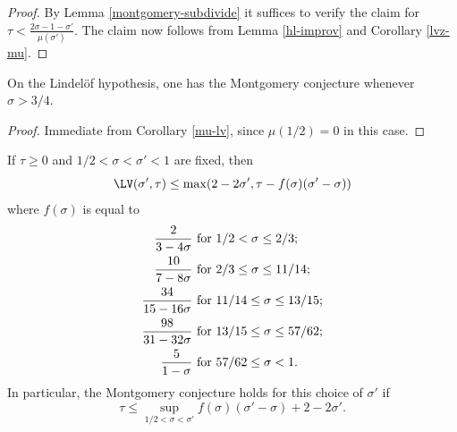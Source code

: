 \begin{proof} By Lemma \ref{montgomery-subdivide} it suffices to verify the claim for $\tau < \frac{2\sigma-1-\sigma'}{\mu(\sigma')}$.  The claim now follows from Lemma \ref{hl-improv} and Corollary \ref{lvz-mu}.
\end{proof}


\begin{theorem}\label{htlv}\cite[Theorem 1]{halasz_distribution_1969} On the Lindel\"of hypothesis, one has the Montgomery conjecture whenever $\sigma > 3/4$.
\end{theorem}

\begin{proof}  Immediate from Corollary \ref{mu-lv}, since $\mu(1/2)=0$ in this case.
\end{proof}

\begin{theorem}\label{ivic-lvt-82}\cite[Lemma 8.2]{ivic}  If $\tau \geq 0$ and $1/2 < \sigma < \sigma' < 1$ are fixed, then
    $$ \LV(\sigma', \tau) \leq \max( 2 - 2\sigma', \tau - f(\sigma) (\sigma'-\sigma) )$$
    where $f(\sigma)$ is equal to
    \begin{align*}
        \frac{2}{3-4\sigma}    & \hbox{ for } 1/2 < \sigma \leq 2/3;        \\
        \frac{10}{7-8\sigma}   & \hbox{ for } 2/3 \leq \sigma \leq 11/14;   \\
        \frac{34}{15-16\sigma} & \hbox{ for } 11/14 \leq \sigma \leq 13/15; \\
        \frac{98}{31-32\sigma} & \hbox{ for } 13/15 \leq \sigma \leq 57/62; \\
        \frac{5}{1-\sigma}     & \hbox{ for } 57/62 \leq \sigma < 1.
    \end{align*}
    In particular, the Montgomery conjecture holds for this choice of $\sigma'$ if
    $$ \tau \leq \sup_{1/2 < \sigma < \sigma'} f(\sigma) (\sigma'-\sigma) + 2 - 2 \sigma'.$$
\end{theorem}

